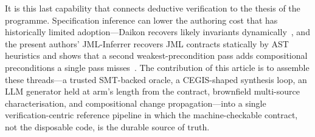 It is this last capability that connects deductive verification to the thesis of
the programme. Specification inference can lower the authoring cost that has
historically limited adoption---Daikon recovers likely invariants
dynamically~\cite{ernst2007daikon}, and the present authors' JML-Inferrer
recovers JML contracts statically by AST heuristics and shows that a second
weakest-precondition pass adds compositional preconditions a single pass
misses~\cite{edmonds_article3}. The contribution of this article is to assemble
these threads---a trusted SMT-backed oracle, a CEGIS-shaped synthesis loop, an
LLM generator held at arm's length from the contract, brownfield
multi-source characterisation, and compositional change propagation---into a
single verification-centric reference pipeline in which the machine-checkable
contract, not the disposable code, is the durable source of truth.
